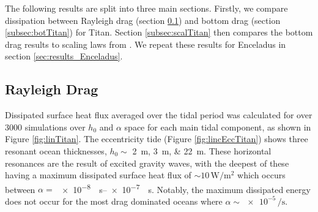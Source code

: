 The following results are split into three main sections. Firstly, we compare dissipation between Rayleigh drag (section \ref{sec:ray_titan}) and bottom drag (section \ref{subsec:botTitan}) for Titan. Section \ref{subsec:scalTitan} then compares the bottom drag results to scaling laws from \citet{chen2013tidal}. We repeat these results for Enceladus in section \ref{sec:results_Enceladus}.

\subsection{Rayleigh Drag}\label{sec:ray_titan}

Dissipated surface heat flux averaged over the tidal period was calculated for over 3000 simulations over $h_0$ and $\alpha$ space for each main tidal component, as shown in Figure \ref{fig:linTitan}. The eccentricity tide (Figure \ref{fig:lincEccTitan}) shows three resonant ocean thicknesses, $h_0 \sim$ \SIlist{2;3;22}{\metre}. These horizontal resonances are the result of excited gravity waves, with the deepest of these having a maximum dissipated surface heat flux of $\sim 10\, \si{\watt\per\square\metre}$ which occurs between $\alpha =$ \SIrange{e-8}{e-7}{\per\second}. Notably, the maximum dissipated energy does not occur for the most drag dominated oceans where $\alpha \sim \num{e-5} \, \si{\per\second}$. 

